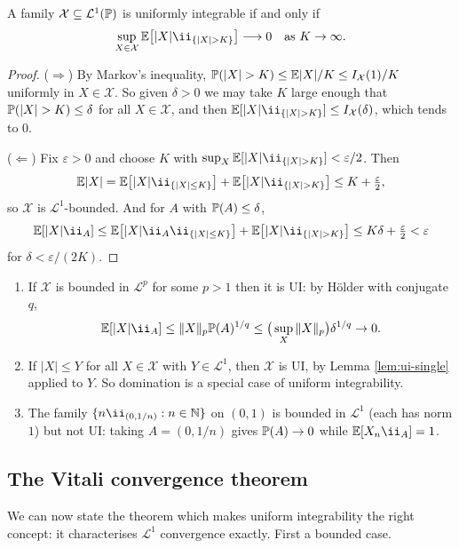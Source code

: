 \documentclass[a4paper]{scrartcl}
\newcommand{\cL}{\mathcal{L}}
\newcommand{\cX}{\mathcal{X}}
\newcommand{\ind}{\ii}
\begin{document}
\begin{lemma}\label{lem:ui-equiv}
	A family $\cX\subseteq\cL^1(\PP)$ is uniformly integrable if and only if
	$$
	\sup_{X\in\cX}\EE\big[|X|\ind_{\{|X|>K\}}\big] \longrightarrow 0 \quad \text{as } K \to \infty.
	$$
\end{lemma}
\begin{proof}
	($\Rightarrow$) By Markov's inequality, $\PP(|X|>K)\leq \EE|X|/K \leq I_\cX(1)/K$ uniformly in $X\in\cX$. So given $\delta>0$ we may take $K$ large enough that $\PP(|X|>K)\leq\delta$ for all $X \in \cX$, and then $\EE[|X|\ind_{\{|X|>K\}}]\leq I_\cX(\delta)$, which tends to $0$.

	($\Leftarrow$) Fix $\varepsilon>0$ and choose $K$ with $\sup_{X}\EE[|X|\ind_{\{|X|>K\}}]<\varepsilon/2$. Then
	$$
	\EE|X| = \EE\big[|X|\ind_{\{|X|\leq K\}}\big]+\EE\big[|X|\ind_{\{|X|>K\}}\big] \leq K + \tfrac\varepsilon2,
	$$
	so $\cX$ is $\cL^1$-bounded. And for $A$ with $\mathbb{P}(A)\leq\delta$,
	$$
	\EE[|X|\ind_A] \leq \EE\big[|X|\ind_A\ind_{\{|X|\leq K\}}\big]+\EE\big[|X|\ind_{\{|X|>K\}}\big] \leq K\delta+\tfrac\varepsilon2 < \varepsilon
	$$
	for $\delta < \varepsilon/(2K)$.
\end{proof}

\begin{example}
	\begin{enumerate}[label=(\roman*)]
		\item If $\cX$ is bounded in $\cL^p$ for some $p>1$ then it is UI: by H\"older with conjugate $q$,
		$$
		\EE[|X|\ind_A] \leq \|X\|_p \PP(A)^{1/q} \leq \big(\sup_X\|X\|_p\big)\delta^{1/q}\to0.
		$$
		\item If $|X| \leq Y$ for all $X \in \cX$ with $Y \in\cL^1$, then $\cX$ is UI, by Lemma \ref{lem:ui-single} applied to $Y$. So domination is a special case of uniform integrability.
		\item The family $\{n\ind_{(0,1/n)} : n\in\N\}$ on $(0,1)$ is bounded in $\cL^1$ (each has norm $1$) but not UI: taking $A = (0,1/n)$ gives $\mathbb{P}(A)\to0$ while $\EE[X_n \ind_A]=1$.
	\end{enumerate}
\end{example}

\subsection{The Vitali convergence theorem}

We can now state the theorem which makes uniform integrability the right concept: it characterises $\cL^1$ convergence exactly. First a bounded case.
\end{document}

